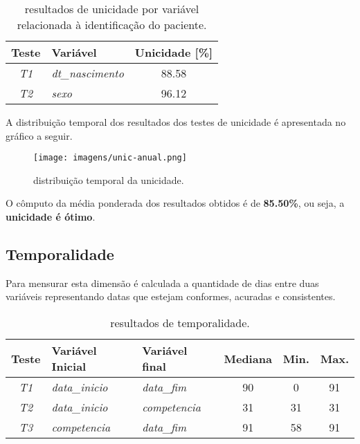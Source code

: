 \documentclass[
  12,
  table]{proadi}
\begin{document}
\begin{table}[H]

\caption{\label{tab:unnamed-chunk-19}resultados de unicidade por variável relacionada à identificação do paciente.}
\centering
\fontsize{10}{12}\selectfont
\begin{tabular}[t]{>{}c>{}lc}
\toprule
Teste & Variável & Unicidade [\%]\\
\midrule
\em{T1} & \em{dt\_nascimento} & 88.58\\
\em{T2} & \em{sexo} & 96.12\\
\bottomrule
\end{tabular}
\end{table}

A distribuição temporal dos resultados dos testes de unicidade é
apresentada no gráfico a seguir.

\begin{figure}
\centering
\texttt{[image: imagens/unic-anual.png]}
\caption{distribuição temporal da unicidade.}
\end{figure}

O cômputo da média ponderada dos resultados obtidos é de
\textbf{85.50\%}, ou seja, a \textbf{unicidade é ótimo}.

\hypertarget{temporalidade}{%
\subsection{Temporalidade}\label{temporalidade}}

Para mensurar esta dimensão é calculada a quantidade de dias entre duas
variáveis representando datas que estejam conformes, acuradas e
consistentes.

\begin{table}[H]

\caption{\label{tab:unnamed-chunk-20}resultados de temporalidade.}
\centering
\fontsize{10}{12}\selectfont
\begin{tabular}[t]{>{}c>{}l>{}lccc}
\toprule
Teste & Variável Inicial & Variável final & Mediana & Min. & Max.\\
\midrule
\em{T1} & \em{data\_inicio} & \em{data\_fim} & 90 & 0 & 91\\
\em{T2} & \em{data\_inicio} & \em{competencia} & 31 & 31 & 31\\
\em{T3} & \em{competencia} & \em{data\_fim} & 91 & 58 & 91\\
\bottomrule
\end{tabular}
\end{table}
\end{document}
